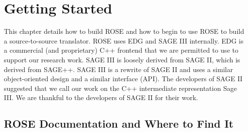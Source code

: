 \chapter{Getting Started}

\label{gettingStarted:gettingStarted}



   This chapter details how to build ROSE and how to begin to use ROSE to build a 
source-to-source translator.
ROSE uses EDG and SAGE III internally. EDG is a commercial (and proprietary) C++
frontend that we are permitted to use to support our research work. SAGE III is
loosely derived from SAGE II, which is derived from SAGE++.  SAGE III is a rewrite of 
SAGE II and uses a similar object-oriented design and a similar interface (API).
The developers of SAGE II suggested that we call our work on the C++
intermediate representation Sage III. We are thankful to the developers
of SAGE II for their work.

\section{ROSE Documentation and Where to Find It}

